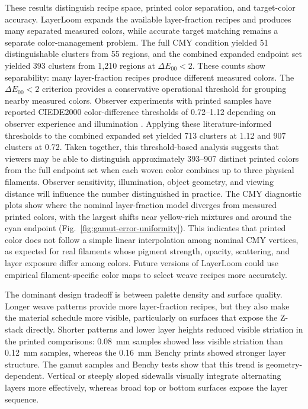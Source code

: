 \documentclass[5p,times,numbers]{elsarticle}
\begin{document}
These results distinguish recipe space, printed color separation, and target-color accuracy. LayerLoom expands the available layer-fraction recipes and produces many separated measured colors, while accurate target matching remains a separate color-management problem. The full CMY condition yielded 51 distinguishable clusters from 55 regions, and the combined expanded endpoint set yielded 393 clusters from 1,210 regions at \(\Delta E_{00}<2\). These counts show separability: many layer-fraction recipes produce different measured colors. The \(\Delta E_{00}<2\) criterion provides a conservative operational threshold for grouping nearby measured colors. Observer experiments with printed samples have reported CIEDE2000 color-difference thresholds of 0.72--1.12 depending on observer experience and illumination \citep{huang2025acceptable}. Applying these literature-informed thresholds to the combined expanded set yielded 713 clusters at 1.12 and 907 clusters at 0.72. Taken together, this threshold-based analysis suggests that viewers may be able to distinguish approximately 393--907 distinct printed colors from the full endpoint set when each woven color combines up to three physical filaments. Observer sensitivity, illumination, object geometry, and viewing distance will influence the number distinguished in practice. The CMY diagnostic plots show where the nominal layer-fraction model diverges from measured printed colors, with the largest shifts near yellow-rich mixtures and around the cyan endpoint (Fig.~\ref{fig:gamut-error-uniformity}). This indicates that printed color does not follow a simple linear interpolation among nominal CMY vertices, as expected for real filaments whose pigment strength, opacity, scattering, and layer exposure differ among colors. Future versions of LayerLoom could use empirical filament-specific color maps to select weave recipes more accurately.

The dominant design tradeoff is between palette density and surface quality. Longer weave patterns provide more layer-fraction recipes, but they also make the material schedule more visible, particularly on surfaces that expose the Z-stack directly. Shorter patterns and lower layer heights reduced visible striation in the printed comparisons: 0.08~mm samples showed less visible striation than 0.12~mm samples, whereas the 0.16~mm Benchy prints showed stronger layer structure. The gamut samples and Benchy tests show that this trend is geometry-dependent. Vertical or steeply sloped sidewalls visually integrate alternating layers more effectively, whereas broad top or bottom surfaces expose the layer sequence.
\end{document}
